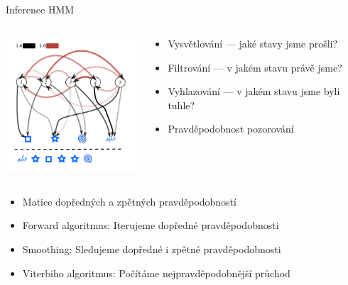 \documentclass{beamer}
\begin{document}
\subsection{}
\begin{frame}{Inference HMM}
\begin{columns}
\begin{column}{5cm}
\includegraphics[width=5cm]{HMMsequence.pdf}
\end{column}
\begin{column}{6cm}
\begin{itemize}
\item Vysvětlování --- jaké stavy jsme prošli?
\item Filtrování --- v jakém stavu právě jsme?
\item Vyhlazování --- v jakém stavu jsme byli tuhle?
\item Pravděpodobnost pozorování
\end{itemize}
\end{column}
\end{columns}

\begin{itemize}
\item Matice dopředných a zpětných pravděpodobností
\item Forward algoritmus: Iterujeme dopředné pravděpodobnosti
\item Smoothing: Sledujeme dopředné i zpětné pravděpodobnosti
\item Viterbiho algoritmus: Počítáme nejpravděpodobnější průchod
\end{itemize}
\end{frame}
\end{document}
